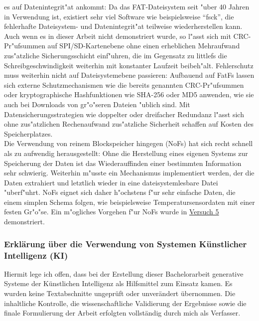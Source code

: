 \documentclass[11pt]{article}
\begin{document}
es auf Datenintegrit"at ankommt:
Da das FAT-Dateisystem seit "uber 40 Jahren in Verwendung ist, existiert sehr viel Software wie 
beispielsweise \enquote{fsck}, die fehlerhafte Dateisystem- und Datenintegrit"at teilweise wiederherstellen kann.
Auch wenn es in dieser Arbeit nicht demonstriert wurde, so l"asst sich mit CRC-Pr"ufsummen auf SPI/SD-Kartenebene ohne einen erheblichen
Mehraufwand zus"atzliche Sicherungsschicht einf"uhren, die im Gegensatz zu littlefs die Schreibgeschwindigkeit weiterhin 
mit konstanter Laufzeit beibeh"alt. 
Fehlerschutz muss weiterhin nicht auf Dateisystemebene passieren: Aufbauend auf FatFs lassen sich externe Schutzmechanismen
wie die bereits genannten CRC-Pr"ufsummen oder kryptographische Hashfunktionen wie SHA-256 oder MD5 anwenden,
wie sie auch bei Downloads von gr"o"seren Dateien "ublich sind. Mit Datensicherungsstrategien wie doppelter oder dreifacher
Redundanz l"asst sich ohne zus"atzlichen Rechenaufwand zus"atzliche Sicherheit schaffen auf Kosten des Speicherplatzes.\\     
Die Verwendung von reinem Blockspeicher hingegen (NoFs) hat sich recht schnell als zu aufwendig herausgestellt:
Ohne die Herstellung eines eigenen Systems zur Speicherung der Daten ist das Wiederauffinden einer bestimmten
Information sehr schwierig. Weiterhin m"usste ein Mechanismus implementiert werden, der die Daten extrahiert
und letztlich wieder in eine dateisystemlesbare Datei "uberf"uhrt. NoFs eignet sich daher h"ochstens f"ur 
sehr einfache Daten, die einem simplen Schema folgen, wie beispielsweise Temperatursensordaten mit einer
festen Gr"o"se. Ein m"ogliches Vorgehen f"ur NoFs wurde in \hyperref[sec:v5]{Versuch 5} demonstriert.\\












\subsubsection*{Erklärung über die Verwendung von Systemen Künstlicher Intelligenz (KI)}
Hiermit lege ich offen, dass bei der Erstellung dieser Bachelorarbeit generative Systeme der Künstlichen Intelligenz als Hilfsmittel
zum Einsatz kamen. Es wurden keine Textabschnitte ungeprüft oder unverändert übernommen. Die inhaltliche Kontrolle, 
die wissenschaftliche Validierung der Ergebnisse sowie die finale Formulierung der Arbeit
erfolgten vollständig durch mich als Verfasser.
\end{document}
